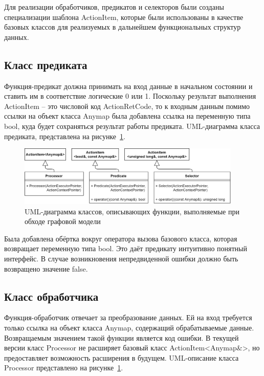 Для реализации обработчиков, предикатов и селекторов были созданы специализации шаблона \textsf{ActionItem}, которые были использованы в качестве базовых классов для реализуемых в дальнейшем функциональных структур данных.

\subsection{Класс предиката}
Функция-предикат должна принимать на вход данные в начальном состоянии и ставить им в соответствие логические 0 или 1. Поскольку результат выполнения \textsf{ActionItem} -- это числовой код \textsf{ActionRetCode}, то к входным данным помимо ссылки на объект класса Anymap была добавлена ссылка на переменную типа bool, куда будет сохраняться результат работы предиката. UML-диаграмма класса предиката, представлена на рисунке~\ref{fig:UMLGraphFunctions}.
\begin{figure}[!ht]
    \centering
    \includegraphics[width=0.95\textwidth]{figures/UML.graphFunctions.png}
    \caption{UML-диаграмма классов, описывающих функции, выполняемые при обходе графовой модели}
    \label{fig:UMLGraphFunctions}
\end{figure}

Была добавлена обёртка вокруг оператора вызова базового класса, которая возвращает переменную типа bool. Это даёт предикату интуитивно понятный интерфейс. В случае возникновения непредвиденной ошибки должно быть возвращено значение \textsf{false}.

\subsection{Класс обработчика}
Функция-обработчик отвечает за преобразование данных. Ей на вход требуется только ссылка на объект класса Anymap, содержащий обрабатываемые данные. Возвращаемым значением такой функции является код ошибки. В текущей версии класс \textsf{Processor} не расширяет базовый класс \textsf{ActionItem<Anymap\&>}, но предоставляет возможность расширения в будущем. UML-описание класса \textsf{Processor} представлено на рисунке~\ref{fig:UMLGraphFunctions}.

